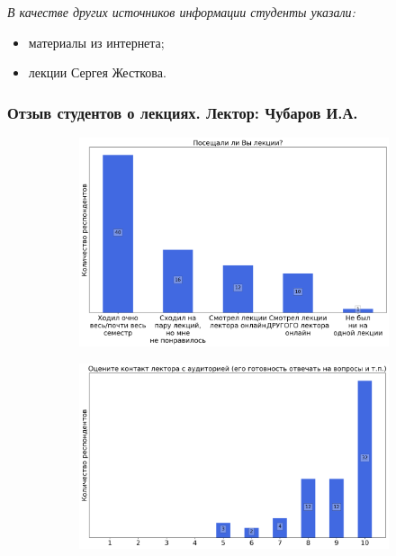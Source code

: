 		\textit{В качестве других источников информации студенты указали:} 
		\begin{itemize}
			\item материалы из интернета;
			\item лекции Сергея Жесткова.
		\end{itemize}

	\subsubsection{Отзыв студентов о лекциях. Лектор: Чубаров И.А.}

		\begin{figure}[H]
			\centering
            \begin{subfigure}[b]{0.45\textwidth}
				\centering
				\includegraphics[width=\textwidth]{images/1 course/Аналитическая геометрия/lecturer-questions-Чубаров И.А.-0.png}
			\end{subfigure}
			\begin{subfigure}[b]{0.45\textwidth}
				\centering
				\includegraphics[width=\textwidth]{images/1 course/Аналитическая геометрия/lecturer-marks-Чубаров И.А.-0.png}

\end{subfigure}
\end{figure}
